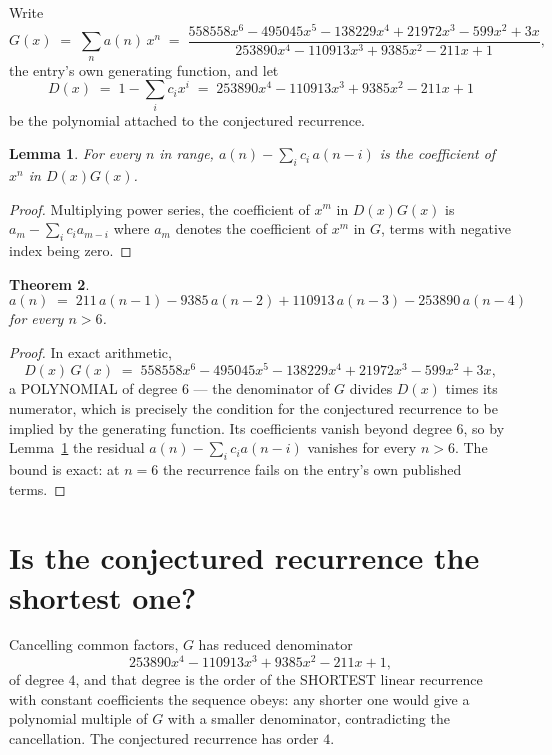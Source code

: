 \documentclass[11pt,a4paper]{article}
\theoremstyle{plain}
\newtheorem{theorem}{Theorem}
\newtheorem{lemma}[theorem]{Lemma}
\theoremstyle{definition}
\begin{document}
Write
\[
G(x)\;=\;\sum_{n}a(n)\,x^{n}\;=\;\frac{558558 x^{6} - 495045 x^{5} - 138229 x^{4} + 21972 x^{3} - 599 x^{2} + 3 x}{253890 x^{4} - 110913 x^{3} + 9385 x^{2} - 211 x + 1},
\]
the entry's own generating function, and let
\[
D(x)\;=\;1-\sum_i c_i x^{i}\;=\;253890 x^{4} - 110913 x^{3} + 9385 x^{2} - 211 x + 1
\]
be the polynomial attached to the conjectured recurrence.

\begin{lemma}\label{lem:key}
For every $n$ in range, $a(n)-\sum_i c_i\,a(n-i)$ is the coefficient of $x^{n}$ in
$D(x)G(x)$.
\end{lemma}

\begin{proof}
Multiplying power series, the coefficient of $x^{m}$ in $D(x)G(x)$ is
$a_m-\sum_i c_i a_{m-i}$ where $a_m$ denotes the coefficient of $x^{m}$ in $G$, terms with
negative index being zero.
\end{proof}

\begin{theorem}
\[
a(n)\;=\;211\,a(n-1) - 9385\,a(n-2) + 110913\,a(n-3) - 253890\,a(n-4)
\]
for every $n>6$.
\end{theorem}

\begin{proof}
In exact arithmetic,
\[
D(x)\,G(x)\;=\;558558 x^{6} - 495045 x^{5} - 138229 x^{4} + 21972 x^{3} - 599 x^{2} + 3 x,
\]
a POLYNOMIAL of degree $6$ --- the denominator of $G$ divides $D(x)$ times its numerator,
which is precisely the condition for the conjectured recurrence to be implied by the
generating function. Its coefficients vanish beyond degree $6$, so by
Lemma~\ref{lem:key} the residual $a(n)-\sum_ic_ia(n-i)$ vanishes for every
$n>6$. The bound is exact: at $n=6$ the recurrence fails on the entry's own published terms.
\end{proof}

\section{Is the conjectured recurrence the shortest one?}

Cancelling common factors, $G$ has reduced denominator
\[
253890 x^{4} - 110913 x^{3} + 9385 x^{2} - 211 x + 1,
\]
of degree $4$, and that degree is the order of the SHORTEST linear recurrence with
constant coefficients the sequence obeys: any shorter one would give a polynomial multiple of
$G$ with a smaller denominator, contradicting the cancellation. The conjectured recurrence has
order $4$.
\end{document}
